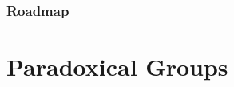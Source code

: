 \documentclass{beamer}
\begin{document}


\begin{frame}
\frametitle{Roadmap}
\begin{center}
\begin{minipage}{\widthof{(4) Representation Theory:\ Categorified}}
\setlength{\parskip}{4ex}
\tableofcontents
\end{minipage}
\end{center}
\end{frame}


\section{Paradoxical Groups}
\end{document}

